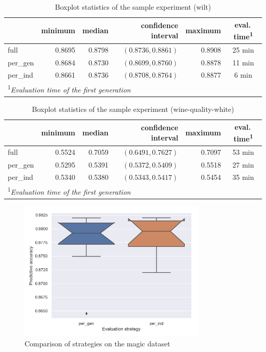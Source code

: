 \begin{table}[ht]
\centering
\caption{Boxplot statistics of the sample experiment (wilt)}\label{tab04:exp1:wboxstats}

\begin{tabular}{lrrrr|c}
\toprule
{} &  minimum & median & confidence interval &  maximum & eval.\,time\textsuperscript{1} \\
\midrule
full     &   0.8695 &  0.8798 &   $(0.8736,0.8861)$ &   0.8908 & 25 min \\
per\_gen &   0.8684 &  0.8730 &   $(0.8699,0.8760)$ &   0.8878 & 11 min \\
per\_ind &   0.8661 &  0.8736 &   $(0.8708,0.8764)$ &   0.8877 & 6 min \\
\bottomrule

\multicolumn{6}{l}{\footnotesize\textsuperscript{1}\itshape Evaluation time of the first generation}

\end{tabular}

\end{table}

\begin{table}[ht]
\centering
\caption{Boxplot statistics of the sample experiment (wine-quality-white)}\label{tab04:exp1:wineboxstats}

\begin{tabular}{lrrrr|c}
\toprule
{} &  minimum &  median & confidence interval &  maximum & eval.\,time\textsuperscript{1} \\
\midrule
full     &   0.5524 &  0.7059 &   $(0.6491,0.7627)$ &   0.7097 & 53 min \\
per\_gen &   0.5295 &  0.5391 &   $(0.5372,0.5409)$ &   0.5518 & 27 min \\
per\_ind &   0.5340 &  0.5380 &   $(0.5343,0.5417)$ &   0.5454 & 35 min \\
\bottomrule

\multicolumn{6}{l}{\footnotesize\textsuperscript{1}\itshape Evaluation time of the first generation}

\end{tabular}

\end{table}

\begin{figure}[b!]\centering
\includegraphics[width=0.8\textwidth]{../img/magic-out.png}
\caption{Comparison of strategies on the magic dataset}
\label{pic04:magic}
\end{figure}

